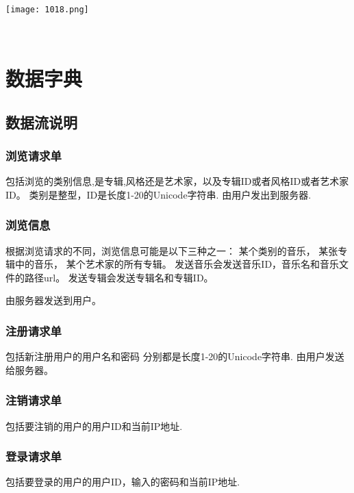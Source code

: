 \quad\\[\intextsep] 
\begin{minipage}{\textwidth} 
  \centering 
  \texttt{[image: 1018.png]}%
  \label{fig:non:float} 
\end{minipage} 
\quad\\[\intextsep] 



\section{数据字典}
\subsection{数据流说明}
\subsubsection{浏览请求单}

包括浏览的类别信息,是专辑,风格还是艺术家，以及专辑ID或者风格ID或者艺术家ID。
类别是整型，ID是长度1-20的Unicode字符串.
由用户发出到服务器.

\subsubsection{浏览信息}

根据浏览请求的不同，浏览信息可能是以下三种之一：
某个类别的音乐，
某张专辑中的音乐，
某个艺术家的所有专辑。
发送音乐会发送音乐ID，音乐名和音乐文件的路径url。
发送专辑会发送专辑名和专辑ID。

由服务器发送到用户。
\subsubsection{注册请求单}

包括新注册用户的用户名和密码
分别都是长度1-20的Unicode字符串.
由用户发送给服务器。

\subsubsection{注销请求单}

包括要注销的用户的用户ID和当前IP地址.

\subsubsection{登录请求单}

包括要登录的用户的用户ID，输入的密码和当前IP地址.

